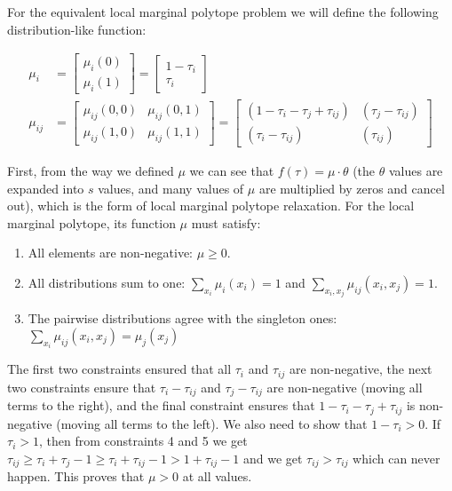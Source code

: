 \documentclass[11pt]{article}
\begin{document}
For the equivalent local marginal polytope problem we will define the following distribution-like function:

\begin{align}
\mu_{i} &=
\begin{bmatrix}
	\mu_{i}(0) \\ \mu_{i}(1)
\end{bmatrix}
=
\begin{bmatrix}
	1 - \tau_{i} \\
	\tau_{i}
\end{bmatrix}
\\
\mu_{ij} &= \begin{bmatrix}
	\mu_{ij}(0,0) & \mu_{ij}(0,1) \\
	\mu_{ij}(1,0) & \mu_{ij}(1,1)
\end{bmatrix}
=
\begin{bmatrix}
	(1 - \tau_{i} - \tau_{j} + \tau_{ij}) & (\tau_{j} - \tau_{ij}) \\
	(\tau_{i} - \tau_{ij}) & (\tau_{ij})
\end{bmatrix}
\end{align}

First, from the way we defined $\mu$ we can see that $f(\tau) = \mu \cdot \theta$ (the $\theta$ values are expanded into $s$ values, and many values of $\mu$ are multiplied by zeros and cancel out), which is the form of local marginal polytope relaxation.
For the local marginal polytope, its function $\mu$ must satisfy:
\begin{enumerate}
\item All elements are non-negative: $\mu \geq 0$.
\item All distributions sum to one: $\sum_{x_i} \mu_i(x_i)=1$ and $\sum_{x_i,x_j} \mu_{ij}(x_i,x_j)=1$.
\item The pairwise distributions agree with the singleton ones:$\sum_{x_i} \mu_{ij}(x_i,x_j)=\mu_j(x_j)$
\end{enumerate}

The first two constraints ensured that all $\tau_i$ and $\tau_{ij}$ are non-negative,
the next two constraints ensure that $\tau_{i} - \tau_{ij}$ and $\tau_{j} - \tau_{ij}$ are non-negative (moving all terms to the right), and the final constraint ensures that $1 - \tau_{i} - \tau_{j} + \tau_{ij}$ is non-negative (moving all terms to the left).
We also need to show that $1 - \tau_i > 0$. If $\tau_i > 1$, then from constraints 4 and 5 we get $\tau_{ij} \geq \tau_i + \tau_j - 1 \geq \tau_i + \tau_{ij} - 1 > 1 + \tau_{ij} - 1$ and we get $\tau_{ij} > \tau_{ij}$ which can never happen. This proves that $\mu > 0$ at all values.
\end{document}

